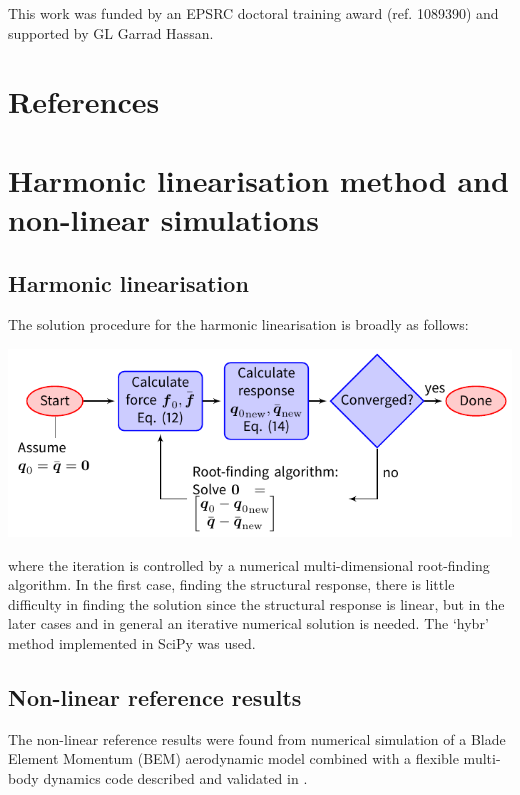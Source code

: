 \documentclass[a4paper,preprint]{elsarticle}
\begin{document}
This work was funded by an EPSRC doctoral training award (ref. 1089390) and
supported by GL Garrad Hassan.

\section*{References}



\clearpage
\appendix

\section{Harmonic linearisation method and non-linear simulations}
\label{sec:appendix-method}

\subsection{Harmonic linearisation}

The solution procedure for the harmonic linearisation is broadly as
follows:

  \hspace{-1cm}
  \includegraphics{tikz/solution}

  \noindent where the iteration is controlled by a numerical multi-dimensional
  root-finding algorithm. In the first case, finding the structural response,
  there is little difficulty in finding the solution since the structural
  response is linear, but in the later cases and in general an iterative
  numerical solution is needed. The `hybr' method implemented in SciPy
  \citep{SciPy} was used.

\subsection{Non-linear reference results}
\label{sec:appendix-method-nonlinear}

The non-linear reference results were found from numerical simulation of a Blade
Element Momentum (BEM) aerodynamic model combined with a flexible multi-body
dynamics code described and validated in \citet{lupton_frequencydomain_2015}.
\end{document}
